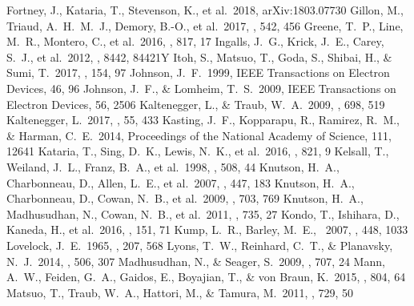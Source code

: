 \documentclass{aastex62}
\begin{document}
\begin{thebibliography}{}
 Fortney, J., Kataria, T., Stevenson, K., et al.\ 2018, arXiv:1803.07730
 Gillon, M., Triaud, A.~H.~M.~J., Demory, B.-O., et al.\ 2017, \nat, 542, 456
 Greene, T.~P., Line, M.~R., Montero, C., et al.\ 2016, \apj, 817, 17
 Ingalls, J.~G., Krick, J.~E., Carey, S.~J., et al.\ 2012, \procspie, 8442, 84421Y
 Itoh, S., Matsuo, T., Goda, S., Shibai, H., \& Sumi, T.\ 2017, \aj, 154, 97
 Johnson, J.~F.\ 1999, IEEE Transactions on Electron Devices, 46, 96
 Johnson, J.~F., \& Lomheim, T.~S.\ 2009, IEEE Transactions on Electron Devices, 56, 2506
 Kaltenegger, L., \& Traub, W.~A.\ 2009, \apj, 698, 519
 Kaltenegger, L.\ 2017, \araa, 55, 433
 Kasting, J.~F., Kopparapu, R., Ramirez, R.~M., \& Harman, C.~E.\ 2014, Proceedings of the National Academy of Science, 111, 12641
 Kataria, T., Sing, D.~K., Lewis, N.~K., et al.\ 2016, \apj, 821, 9
 Kelsall, T., Weiland, J.~L., Franz, B.~A., et al.\ 1998, \apj, 508, 44
 Knutson, H.~A., Charbonneau, D., Allen, L.~E., et al.\ 2007, \nat, 447, 183
 Knutson, H.~A., Charbonneau, D., Cowan, N.~B., et al.\ 2009, \apj, 703, 769
 Knutson, H.~A., Madhusudhan, N., Cowan, N.~B., et al.\ 2011, \apj, 735, 27
 Kondo, T., Ishihara, D., Kaneda, H., et al.\ 2016, \aj, 151, 71
 Kump, L.~R., Barley, M.~E., \ 2007, \nat, 448, 1033
 Lovelock, J.~E.\ 1965, \nat, 207, 568
 Lyons, T.~W., Reinhard, C.~T., \& Planavsky, N.~J.\ 2014, \nat, 506, 307
 Madhusudhan, N., \& Seager, S.\ 2009, \apj, 707, 24
 Mann, A.~W., Feiden, G.~A., Gaidos, E., Boyajian, T., \& von Braun, K.\ 2015, \apj, 804, 64
 Matsuo, T., Traub, W.~A., Hattori, M., \& Tamura, M.\ 2011, \apj, 729, 50

\end{thebibliography}
\end{document}
